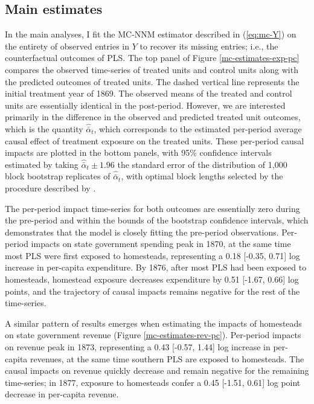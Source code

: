 \subsection{Main estimates} \label{main-estimates}

In the main analyses, I fit the MC-NNM estimator described in (\ref{eq:mc-Y}) on the entirety of observed entries in $Y$ to recover its missing entries; i.e., the counterfactual outcomes of PLS. The top panel of Figure \ref{mc-estimates-exp-pc} compares the observed time-series of treated units and control units along with the predicted outcomes of treated units. The dashed vertical line represents the initial treatment year of 1869. The observed means of the treated and control units are essentially identical in the post-period. However, we are interested primarily in the difference in the observed and predicted treated unit outcomes, which is the quantity $\hat{\bar{\alpha}}_{t}$, which corresponds to the estimated per-period average causal effect of treatment exposure on the treated units. These per-period causal impacts are plotted in the bottom panels, with 95\% confidence intervals estimated by taking $\hat{\bar{\alpha}}_{t} \pm 1.96$ the standard error of the distribution of 1,000 block bootstrap replicates of $\hat{\bar{\alpha}}_{t}$, with optimal block lengths selected by the procedure described by \citet{politis2004automatic}. 

The per-period impact time-series for both outcomes are essentially zero during the pre-period and within the bounds of the bootstrap confidence intervals, which demonstrates that the model is closely fitting the pre-period observations. Per-period impacts on state government spending peak in 1870, at the same time most PLS were first exposed to homesteads, representing a 0.18 [-0.35, 0.71] log increase in per-capita expenditure. By 1876, after most PLS had been exposed to homesteads, homestead exposure decreases expenditure by 0.51 [-1.67, 0.66] log points, and the trajectory of causal impacts remains negative for the rest of the time-series.

A similar pattern of results emerges when estimating the impacts of homesteads on state government revenue (Figure \ref{mc-estimates-rev-pc}). Per-period impacts on revenue peak in 1873, representing a 0.43 [-0.57, 1.44] log increase in per-capita revenues, at the same time southern PLS are exposed to homesteads. The causal impacts on revenue quickly decrease and remain negative for the remaining time-series; in 1877, exposure to homesteads confer a 0.45 [-1.51, 0.61] log point decrease in per-capita revenue. 

